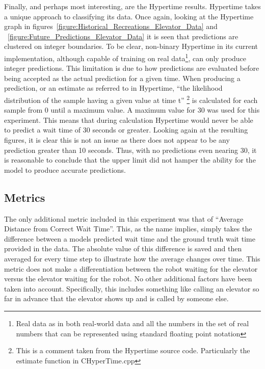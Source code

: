 Finally, and perhaps most interesting, are the Hypertime results. Hypertime takes a
unique approach to classifying its data. Once again, looking at the Hypertime
graph in figures~\ref{figure:Historical_Recreations_Elevator_Data} and
~\ref{figure:Future_Predictions_Elevator_Data}
it is seen that predictions are clustered on integer boundaries. To be clear,
non-binary Hypertime in its current implementation, although capable of training
on real data\footnote[1]{Real data as in both real-world data and all the numbers in the set of real numbers that can be represented using standard floating point notation},
can only produce
integer predictions. This limitation is due to how predictions are evaluated
before being accepted as the actual prediction for a given time.
When producing a prediction, or an
estimate as referred to in Hypertime, ``the likelihood distribution of the
sample having a given value at time t''
\footnote[2]{This is a comment taken from the Hypertime source code. Particularly the estimate function in CHyperTime.cpp}
is calculated
for each sample from 0 until a maximum value. A maximum value for 30 was used
for this experiment. This means that during calculation Hypertime would never
be able to predict a wait time of 30 seconds or greater. Looking again at the
resulting figures, it is clear this is not an issue as there does not appear to
be any prediction greater than 10 seconds. Thus, with no predictions even
nearing 30, it is reasonable to conclude that the upper limit did not hamper the ability for
the model to produce accurate predictions. \\

\subsection{ Metrics }

The only additional metric included in this experiment was that of ``Average
Distance from Correct Wait Time''. This, as the name implies, simply takes the
difference between a models predicted wait time and the ground truth wait time
provided in the data. The absolute value of this difference is saved and then
averaged for every time step to illustrate how the average changes over time. This
metric does not make a differentiation between the robot waiting for the
elevator versus the elevator waiting for the robot. No other additional
factors have been taken into account. Specifically, this includes something like calling an
elevator so far in advance that the elevator shows up and is called by someone else. \\

